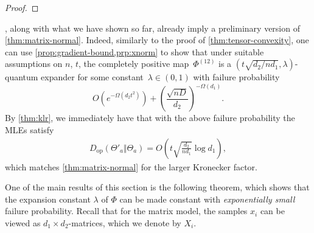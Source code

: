 \documentclass[aos]{imsart}
\theoremstyle{definition}
\numberwithin{equation}{section}
\DeclareMathOperator{\op}{op}
\DeclareMathOperator{\tr}{Tr}
\DeclarePairedDelimiter{\abs}{\lvert}{\rvert}
\DeclarePairedDelimiter{\norm}{\lVert}{\rVert}
\newcommand{\htheta}{\widehat{\Theta}}
\newcommand{\eps}{\varepsilon}
\newcommand{\Dop}{D_{\operatorname{op}}}
\begin{document}
\begin{proof}
\end{proof}

, along with what we have shown so far, already imply a preliminary version of \cref{thm:matrix-normal}.
Indeed, similarly to the proof of \cref{thm:tensor-convexity}, one can use \cref{prop:gradient-bound,prp:xnorm} to show that under suitable assumptions on $n$, $t$, the completely positive map~$\Phi^{(12)}$ is a $(t \sqrt{{d_2}/{n d_1}}, \lambda)$-quantum expander for some constant~$\lambda\in(0,1)$ with failure probability
\[ O(e^{ - \Omega( d_2 t^2)}) + \left( \frac{\sqrt{nD}}{d_2} \right)^{ - \Omega(d_1)}. \]
By \cref{thm:klr}, we immediately have that with the above failure probability the MLEs satisfy
\begin{align*}
  \Dop(\Theta'_a \Vert \Theta_a) = O\left(t \sqrt{\frac{d_2}{n d_1}} \log d_1\right),
\end{align*}
which matches \cref{thm:matrix-normal} for the larger Kronecker factor.

One of the main results of this section is the following theorem, which shows that the expansion constant $\lambda$ of $\Phi$ can be made constant with \emph{exponentially small} failure probability.
Recall that for the matrix model, the samples $x_i$ can be viewed as $d_1 \times d_2$-matrices, which we denote by $X_i$.
\end{document}
